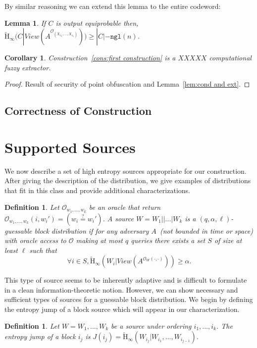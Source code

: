 \documentclass[11pt]{article}
\newcommand{\lemref}[1]{\mbox{Lemma~\ref{#1}}}
\newcommand{\consref}[1]{\mbox{Construction~\ref{#1}}}
\newcommand{\ngl}{\ensuremath{\mathtt{ngl}}\xspace}
\newcommand{\Hoo}{\mathrm{H}_\infty}
\newcommand{\Hav}{\tilde{\mathrm{H}}_\infty}
\newtheorem{lemma}[theorem]{Lemma}
\newtheorem{corollary}[theorem]{Corollary}
\newtheorem{definition}[theorem]{Definition}
\begin{document}
By similar reasoning we can extend this lemma to the entire codeword:
\begin{lemma}
If $C$ is output equiprobable then, $\Hav(C | View(A^{\mathcal{O}_{(X_{c_{2_1}},..., X_{c_{2_\ell}})}})) \geq |C| - \ngl(n)$.
\end{lemma}
\begin{corollary}
\consref{cons:first construction} is a $XXXXX$ computational fuzzy extractor.
\end{corollary}
\begin{proof}
Result of security of point obfuscation and \lemref{lem:cond and ext}.
\end{proof}

\subsection{Correctness of Construction}
\section{Supported Sources}
We now describe a set of high entropy sources appropriate for our construction.  After giving the description of the distribution, we give examples of distributions that fit in this class and provide additional characterizations.

\begin{definition}
Let $\mathcal{O}_{w_1,..., w_k}$ be an oracle that return $\mathcal{O}_{w_1,..., w_k}(i, w_i')=\left( w_i\overset{?}=w_i'\right)$.
A source $W = W_1||...|W_k$ is a $(q, \alpha, \ell)$-\emph{guessable block distribution} if for any adversary $A$~(not bounded in time or space) with oracle access to $\mathcal{O}$ making at most $q$ queries there exists a set $S$ of size at least $\ell$ such that 
\[
\forall i\in S, \Hav(W_i |View(A^{\mathcal{O}_{W}(\cdot, \cdot)}))\geq \alpha.
\]
\end{definition}
This type of source seems to be inherently adaptive and is difficult to formulate in a clean information-theoretic notion.  However, we can show necessary and sufficient types of sources for a guessable block distribution.  We begin by defining the entropy jump of a block source which will appear in our characterization.

\begin{definition}
Let $W = W_1,..., W_k$ be a source under ordering $i_1,..., i_k$.  The \emph{entropy jump} of a block $i_j$ is $J(i_j) = \Hav(W_{i_j} | W_{i_1},..., W_{i_{j-1}})$.
\end{definition}
\end{document}
